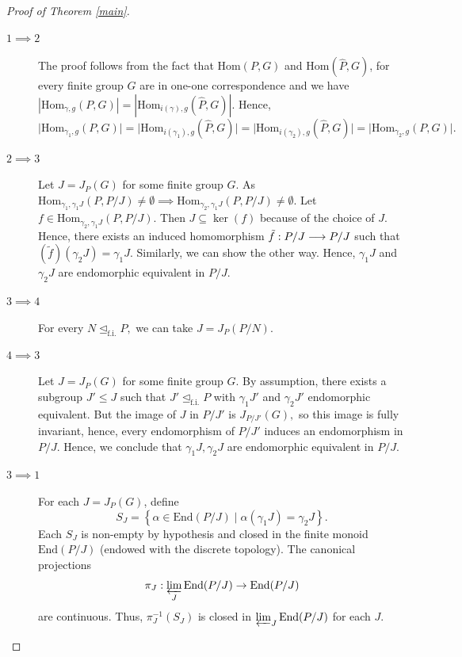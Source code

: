 \documentclass[12pt]{amsart}
\begin{document}
\begin{proof}[Proof of Theorem \ref{main}]
\mbox{}
\begin{description}
    \item[$1 \implies 2$] The proof follows from the fact that $\mathrm{Hom}(P,G)$ and $\mathrm{Hom}(\widehat{P},G)$, for every finite group $G$ are in one-one correspondence and we have $| \mathrm{Hom}_{\gamma,g} (P,G)| = |\mathrm{Hom}_{i(\gamma),g}(\widehat{P}, G)|.$ Hence, $$ \vert \mathrm{Hom}_{\gamma_1,g} (P,G)| = |\mathrm{Hom}_{i(\gamma_1),g}(\widehat{P}, G)|  = |\mathrm{Hom}_{i(\gamma_2),g}(\widehat{P}, G)| = |\mathrm{Hom}_{\gamma_2,g} (P,G)|.$$
    \item [$2 \implies 3$] Let $J = J_P(G)$ for some finite group $G$. As $\mathrm{Hom}_{\gamma_1, \gamma_1J}(P, P/J)\neq \emptyset \implies \mathrm{Hom}_{\gamma_2, \gamma_1J}(P,P/J) \neq \emptyset$. Let $f \in \mathrm{Hom}_{\gamma_2, \gamma_1J}(P,P/J).$ Then $J \subseteq \ker(f)$ because of the choice of $J.$ Hence, there exists an induced homomorphism $\Tilde{f}: P/J \longrightarrow P/J$ such that $(\tilde f) (\gamma_2J) = \gamma_1J.$ Similarly, we can show the other way. Hence, $\gamma_1J$ and $\gamma_2J$ are endomorphic equivalent in $P/J$.
    \item [$3 \implies 4$] For every $N \unlhd_{\mathrm{f.i.}}P,$ we can take $J = J_P(P/N).$ 
    \item [$4 \implies 3$] Let $J = J_P(G)$ for some finite group $G.$ By assumption, there exists a subgroup $J' \le J$ such that $J' \unlhd_{\mathrm{f.i.}} P$ with $\gamma_1J'$ and $\gamma_2J'$ endomorphic equivalent. But the image of $J$ in $P/J'$ is $J_{P/J'}(G),$ so this image is fully invariant, hence, every endomorphism of $P/J'$ induces an endomorphism in $P/J$. Hence, we conclude that $\gamma_1J, \gamma_2J$ are endomorphic equivalent in $P/J.$
    \item [$3 \implies 1$] For each $J = J_P(G)$, define
$$
S_J = \left\{ \alpha \in \mathrm{End}(P/J) \mid \alpha(\gamma_1 J) = \gamma_2 J \right\}.
$$
Each $S_J$ is non-empty by hypothesis and closed in the finite monoid $\mathrm{End}(P/J)$ (endowed with the discrete topology). The canonical projections $$\pi_J: \varprojlim_{J} \mathrm{End}(P/J) \to \mathrm{End}(P/J)$$ are continuous. Thus, $\pi_J^{-1}(S_J)$ is closed in $\varprojlim_{J} \mathrm{End}(P/J)$ for each $J$.


\end{description}
\end{proof}
\end{document}
